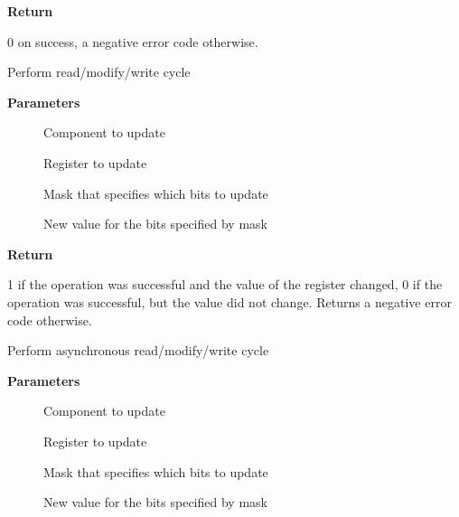\documentclass[a4paper,8pt,english]{sphinxmanual}
\begin{document}
\textbf{Return}

0 on success, a negative error code otherwise.

\begin{fulllineitems}
\label{sound/kernel-api/alsa-driver-api:c.snd_soc_component_update_bits}
Perform read/modify/write cycle

\end{fulllineitems}


\textbf{Parameters}
\begin{description}
\item[{}] \leavevmode
Component to update

\item[{}] \leavevmode
Register to update

\item[{}] \leavevmode
Mask that specifies which bits to update

\item[{}] \leavevmode
New value for the bits specified by mask

\end{description}

\textbf{Return}

1 if the operation was successful and the value of the register
changed, 0 if the operation was successful, but the value did not change.
Returns a negative error code otherwise.

\begin{fulllineitems}
\label{sound/kernel-api/alsa-driver-api:c.snd_soc_component_update_bits_async}
Perform asynchronous read/modify/write cycle

\end{fulllineitems}


\textbf{Parameters}
\begin{description}
\item[{}] \leavevmode
Component to update

\item[{}] \leavevmode
Register to update

\item[{}] \leavevmode
Mask that specifies which bits to update

\item[{}] \leavevmode
New value for the bits specified by mask

\end{description}
\end{document}
